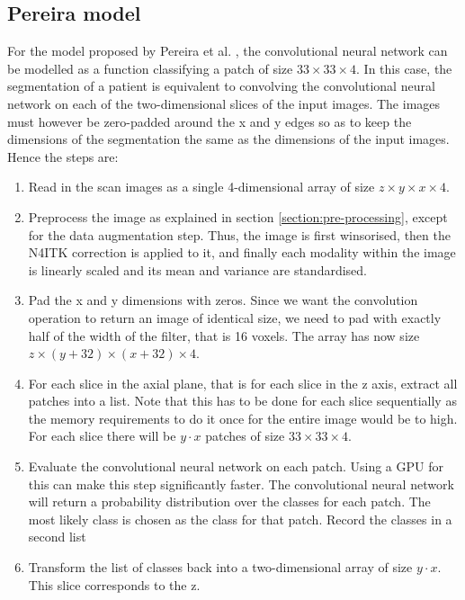 \documentclass[12pt,a4paper,twoside,openright]{report}
\begin{document}
\subsection{Pereira model}
For the model proposed by Pereira et al. \cite{pereira}, the convolutional neural network can be modelled as a function classifying a patch of size $33 \times 33 \times 4$. In this case, the segmentation of a patient is equivalent to convolving the convolutional neural network on each of the two-dimensional slices of the input images. The images must however be zero-padded around the x and y edges so as to keep the dimensions of the segmentation the same as the dimensions of the input images. Hence the steps are:
\begin{enumerate}
	\item Read in the scan images as a single 4-dimensional array of size $z \times y \times x \times 4$.
	\item Preprocess the image as explained in section \ref{section:pre-processing}, except for the data augmentation step. Thus, the image is first winsorised, then the N4ITK correction is applied to it, and finally each modality within the image is linearly scaled and its mean and variance are standardised.
	\item Pad the x and y dimensions with zeros. Since we want the convolution operation to return an image of identical size, we need to pad with exactly half of the width of the filter, that is 16 voxels. The array has now size $z \times (y + 32) \times (x + 32) \times 4$.
	\item For each slice in the axial plane, that is for each slice in the z axis, extract all patches into a list. Note that this has to be done for each slice sequentially as the memory requirements to do it once for the entire image would be to high. For each slice there will be $y \cdot x$ patches of size $33 \times 33 \times 4$.
	\item Evaluate the convolutional neural network on each patch. Using a GPU for this can make this step significantly faster. The convolutional neural network will return a probability distribution over the classes for each patch. The most likely class is chosen as the class for that patch. Record the classes in a second list
	\item Transform the list of classes back into a two-dimensional array of size $y \cdot x$. This slice corresponds to the z.
\end{enumerate}
\end{document}
